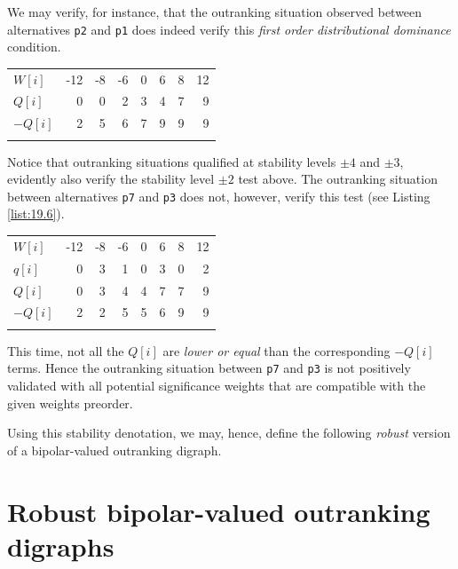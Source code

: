 We may verify, for instance, that the outranking situation observed between alternatives \texttt{p2} and \texttt{p1} does indeed verify this \emph{first order distributional dominance} condition. \hfill
\begin{center}
\begin{tabular}{l|r|r|r|r|r|r|r}
 \svhline\noalign{\smallskip}
  $W[i]$ & -12 & -8  & -6  &  0  &  6  &  8 &  12\\  
 \noalign{\smallskip}\hline\noalign{\smallskip}
  $Q[i]$  &  0 &  0 &   2 &   3  &  4  &  7  &  9 \\
  $-Q[i]$  &  2 &  5 &   6 &   7  &  9  &  9  &  9 \\
 \noalign{\smallskip}\hline
\end{tabular}
\end{center}

Notice that outranking situations qualified at stability levels $\pm 4$ and $\pm 3$, evidently also verify the stability level $\pm 2$ test above. The outranking situation between alternatives \texttt{p7} and \texttt{p3} does not, however, verify this test (see Listing \ref{list:19.6}).\hfill
\begin{center}
\begin{tabular}{l|r|r|r|r|r|r|r}
 \svhline\noalign{\smallskip}
  $W[i]$ & -12 & -8  & -6  &  0  &  6  &  8 &  12\\  
 \noalign{\smallskip}\hline\noalign{\smallskip}
  $q[i]$  &  0 &  3 &   1 &   0  &  3  &  0  &  2 \\
  $Q[i]$  &  0 &  3 &   4 &   4  &  7  &  7  &  9 \\
  $-Q[i]$  &  2 &  2 &   5 &   5  &  6  &  9  &  9 \\
 \noalign{\smallskip}\hline
\end{tabular}
\end{center}
This time, not all the $Q[i]$ are \emph{lower or equal} than the corresponding $-Q[i]$ terms. Hence the outranking situation between \texttt{p7} and \texttt{p3} is not positively validated with all potential significance weights that are compatible with the given weights preorder.

Using this stability denotation, we may, hence, define the following \emph{robust} version of a bipolar-valued outranking digraph.

\section{Robust bipolar-valued outranking digraphs}
\label{sec:19.4}

